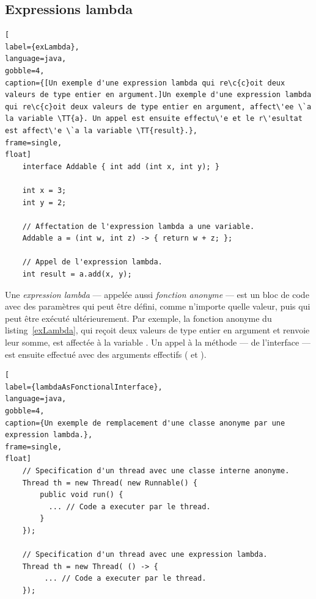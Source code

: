 \subsection{Expressions lambda}




\begin{lstlisting}[
label={exLambda},
language=java,
gobble=4,
caption={[Un exemple d'une expression lambda qui re\c{c}oit deux valeurs de type entier en argument.]Un exemple d'une expression lambda qui re\c{c}oit deux valeurs de type entier en argument, affect\'ee \`a la variable \TT{a}. Un appel est ensuite effectu\'e et le r\'esultat est affect\'e \`a la variable \TT{result}.},
frame=single,
float]
    interface Addable { int add (int x, int y); }
    
    int x = 3;
    int y = 2;
    
    // Affectation de l'expression lambda a une variable.
    Addable a = (int w, int z) -> { return w + z; };

    // Appel de l'expression lambda.
    int result = a.add(x, y);    
\end{lstlisting}



Une \emph{expression lambda} ---  appel\'ee aussi \emph{fonction anonyme} --- est un bloc de code avec des param\`etres qui peut \^etre d\'efini, comme n'importe quelle valeur, puis qui peut \^etre ex\'ecut\'e ult\'erieurement. Par exemple, la fonction anonyme du listing~\ref{exLambda}, qui re\c{c}oit deux valeurs de type entier en argument et renvoie leur somme, est affect\'ee \`a la variable . Un appel \`a la m\'ethode  --- de l'interface  --- est ensuite effectu\'e avec des arguments effectifs ( et ).


\begin{lstlisting}[
label={lambdaAsFonctionalInterface},
language=java,
gobble=4,
caption={Un exemple de remplacement d'une classe anonyme par une expression lambda.},
frame=single,
float]
    // Specification d'un thread avec une classe interne anonyme.
	Thread th = new Thread( new Runnable() {
		public void run() {
          ... // Code a executer par le thread.
		}
	});

    // Specification d'un thread avec une expression lambda.
	Thread th = new Thread( () -> {
         ... // Code a executer par le thread.
	});
\end{lstlisting}


